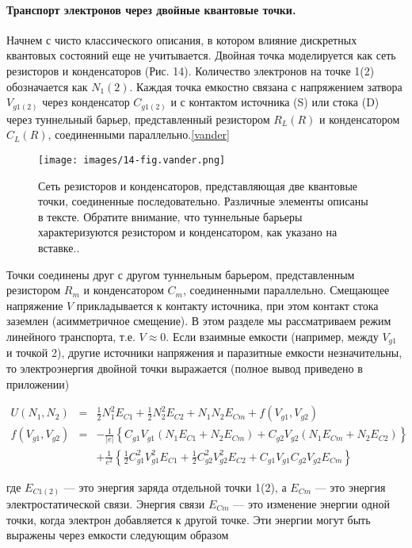 \documentclass[a4paper,14pt]{extarticle}
\begin{document}
\paragraph{Транспорт электронов через двойные квантовые точки.}

Начнем с чисто классического описания, в котором влияние дискретных квантовых состояний еще не учитывается. Двойная точка моделируется как сеть резисторов и конденсаторов (Рис. 14). Количество электронов на точке 1(2) обозначается как \(N_1(2)\). Каждая точка емкостно связана с напряжением затвора \(V_{g1(2)}\) через конденсатор \(C_{g1(2)}\) и с контактом источника (S) или стока (D) через туннельный барьер, представленный резистором \(R_L(R)\) и конденсатором \(C_L(R)\), соединенными параллельно.\ref{vander}

\begin{figure}[htbp]
    \centering
    \texttt{[image: images/14-fig.vander.png]}
    \caption{\label{fig:vander1} Сеть резисторов и конденсаторов, представляющая две квантовые точки, соединенные последовательно. Различные элементы описаны в тексте. Обратите внимание, что туннельные барьеры характеризуются резистором и конденсатором, как указано на вставке.\cite{vander}.}
\end{figure}

Точки соединены друг с другом туннельным барьером, представленным резистором \(R_m\) и конденсатором \(C_m\), соединенными параллельно. Смещающее напряжение \(V\) прикладывается к контакту источника, при этом контакт стока заземлен (асимметричное смещение). В этом разделе мы рассматриваем режим линейного транспорта, т.е. \(V \approx 0\). Если взаимные емкости (например, между \(V_{g1}\) и точкой 2), другие источники напряжения и паразитные емкости незначительны, то электроэнергия двойной точки выражается (полное вывод приведено в приложении)

\begin{eqnarray}
    U(N_1, N_2) &=& \frac{1}{2} N_1^2 E_{C1} + \frac{1}{2} N_2^2 E_{C2} + N_1 N_2 E_{Cm} + f(V_{g1}, V_{g2}) \\
    f(V_{g1}, V_{g2}) &=& -\frac{1}{|e|} \left\{ C_{g1} V_{g1} (N_1 E_{C1} + N_2 E_{Cm}) + C_{g2} V_{g2} (N_1 E_{Cm} + N_2 E_{C2}) \right\} \nonumber \\
    && + \frac{1}{e^2} \left\{ \frac{1}{2} C_{g1}^2 V_{g1}^2 E_{C1} + \frac{1}{2} C_{g2}^2 V_{g2}^2 E_{C2} + C_{g1} V_{g1} C_{g2} V_{g2} E_{Cm} \right\}
    \end{eqnarray}

где \(E_{C1(2)}\) — это энергия заряда отдельной точки 1(2), а \(E_{Cm}\) — это энергия электростатической связи. Энергия связи \(E_{Cm}\) — это изменение энергии одной точки, когда электрон добавляется к другой точке. Эти энергии могут быть выражены через емкости следующим образом
\end{document}

